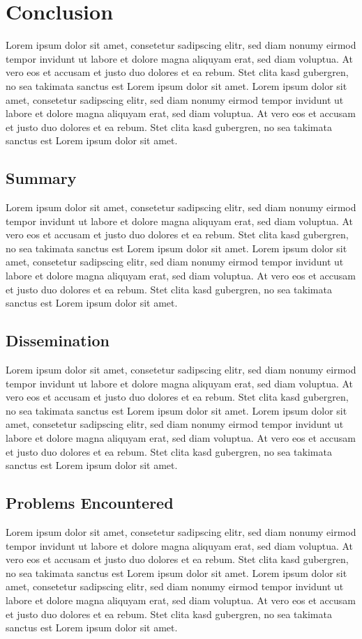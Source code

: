 \documentclass[11pt,oneside,a4paper]{book}
\begin{document}
\chapter{Conclusion}

Lorem\cite{213108} ipsum dolor sit amet, consetetur sadipscing elitr, sed diam nonumy\cite{pullrequest2413} eirmod tempor invidunt ut labore et dolore magna aliquyam erat, sed diam voluptua. At vero eos et accusam et justo duo dolores et ea rebum. Stet clita kasd gubergren, no sea takimata sanctus est Lorem ipsum dolor sit amet. Lorem ipsum dolor sit amet, consetetur sadipscing elitr, sed diam nonumy eirmod tempor invidunt ut labore et dolore magna aliquyam erat, sed diam voluptua. At vero eos et accusam et justo duo dolores et ea rebum. Stet clita kasd gubergren, no sea takimata sanctus est Lorem ipsum dolor sit amet.


\section{Summary}
Lorem ipsum dolor sit amet, consetetur sadipscing elitr, sed diam nonumy eirmod tempor invidunt ut labore et dolore magna aliquyam erat, sed diam voluptua. At vero eos et accusam et justo duo dolores et ea rebum. Stet clita kasd gubergren, no sea takimata sanctus est Lorem ipsum dolor sit amet. Lorem ipsum dolor sit amet, consetetur sadipscing elitr, sed diam nonumy eirmod tempor invidunt ut labore et dolore magna aliquyam erat, sed diam voluptua. At vero eos et accusam et justo duo dolores et ea rebum. Stet clita kasd gubergren, no sea takimata sanctus est Lorem ipsum dolor sit amet.

\section{Dissemination}
Lorem ipsum dolor sit amet, consetetur sadipscing elitr, sed diam nonumy eirmod tempor invidunt ut labore et dolore magna aliquyam erat, sed diam voluptua. At vero eos et accusam et justo duo dolores et ea rebum. Stet clita kasd gubergren, no sea takimata sanctus est Lorem ipsum dolor sit amet. Lorem ipsum dolor sit amet, consetetur sadipscing elitr, sed diam nonumy eirmod tempor invidunt ut labore et dolore magna aliquyam erat, sed diam voluptua. At vero eos et accusam et justo duo dolores et ea rebum. Stet clita kasd gubergren, no sea takimata sanctus est Lorem ipsum dolor sit amet.

\section{Problems Encountered}
Lorem ipsum dolor sit amet, consetetur sadipscing elitr, sed diam nonumy eirmod tempor invidunt ut labore et dolore magna aliquyam erat, sed diam voluptua. At vero eos et accusam et justo duo dolores et ea rebum. Stet clita kasd gubergren, no sea takimata sanctus est Lorem ipsum dolor sit amet. Lorem ipsum dolor sit amet, consetetur sadipscing elitr, sed diam nonumy eirmod tempor invidunt ut labore et dolore magna aliquyam erat, sed diam voluptua. At vero eos et accusam et justo duo dolores et ea rebum. Stet clita kasd gubergren, no sea takimata sanctus est Lorem ipsum dolor sit amet.
\end{document}
